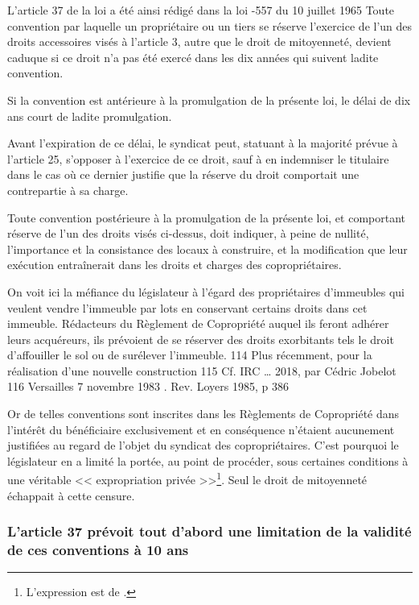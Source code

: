 	L’article 37 de la loi a été ainsi rédigé dans la loi -557 du 10 juillet 1965
	Toute convention par laquelle un propriétaire ou un tiers se réserve l'exercice de l'un des
	droits accessoires visés à l'article 3, autre que le droit de mitoyenneté, devient caduque si
	ce droit n'a pas été exercé dans les dix années qui suivent ladite convention.
	
	Si la convention est antérieure à la promulgation de la présente loi, le délai de dix ans court
	de ladite promulgation.
	
	Avant l'expiration de ce délai, le syndicat peut, statuant à la majorité prévue à l'article 25,
	s'opposer à l'exercice de ce droit, sauf à en indemniser le titulaire dans le cas où ce dernier
	justifie que la réserve du droit comportait une contrepartie à sa charge.
	
	Toute convention postérieure à la promulgation de la présente loi, et comportant réserve
	de l'un des droits visés ci-dessus, doit indiquer, à peine de nullité, l'importance et la
	consistance des locaux à construire, et la modification que leur exécution entraînerait dans
	les droits et charges des copropriétaires.
	
	On voit ici la méfiance du législateur à l'égard des propriétaires d'immeubles qui veulent vendre
	l'immeuble par lots en conservant certains droits dans cet immeuble. Rédacteurs du Règlement de
	Copropriété auquel ils feront adhérer leurs acquéreurs, ils prévoient de se réserver des droits exorbitants
	tels le droit d'affouiller le sol ou de surélever l'immeuble.
	114 Plus récemment, pour la réalisation d’une nouvelle construction
	115 Cf. IRC … 2018, par Cédric Jobelot
	116 Versailles 7 novembre 1983 . Rev. Loyers 1985, p 386

	Or de telles conventions sont inscrites dans les Règlements de Copropriété dans l'intérêt du bénéficiaire
	exclusivement et en conséquence n'étaient aucunement justifiées au regard de l'objet du syndicat des
	copropriétaires. C’est pourquoi le législateur en a limité la portée, au point de procéder, sous certaines
	conditions à une véritable << expropriation privée >>\footnote{L'expression est de .}.
	Seul le droit de mitoyenneté échappait à cette censure.
	
	\subsubsection{L’article 37 prévoit tout d’abord une limitation de la validité de ces conventions à 10	ans}
	
